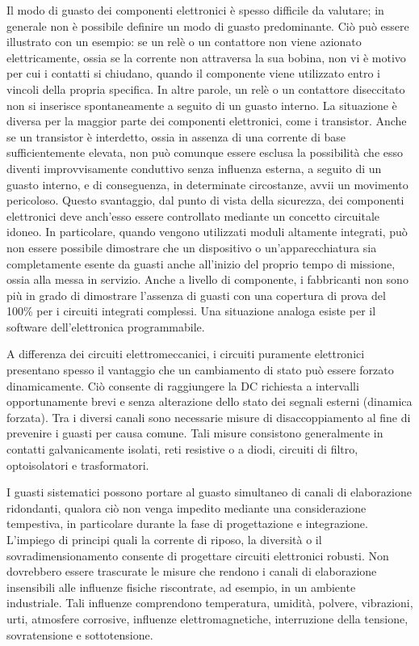 Il modo di guasto dei componenti elettronici è spesso difficile da valutare; in generale non è possibile definire un modo di guasto predominante. Ciò può essere illustrato con un esempio: se un relè o un contattore non viene azionato elettricamente, ossia se la corrente non attraversa la sua bobina, non vi è motivo per cui i contatti si chiudano, quando il componente viene utilizzato entro i vincoli della propria specifica. In altre parole, un relè o un contattore diseccitato non si inserisce spontaneamente a seguito di un guasto interno. La situazione è diversa per la maggior parte dei componenti elettronici, come i transistor. Anche se un transistor è interdetto, ossia in assenza di una corrente di base sufficientemente elevata, non può comunque essere esclusa la possibilità che esso diventi improvvisamente conduttivo senza influenza esterna, a seguito di un guasto interno, e di conseguenza, in determinate circostanze, avvii un movimento pericoloso. Questo svantaggio, dal punto di vista della sicurezza, dei componenti elettronici deve anch'esso essere controllato mediante un concetto circuitale idoneo. In particolare, quando vengono utilizzati moduli altamente integrati, può non essere possibile dimostrare che un dispositivo o un'apparecchiatura sia completamente esente da guasti anche all'inizio del proprio tempo di missione, ossia alla messa in servizio. Anche a livello di componente, i fabbricanti non sono più in grado di dimostrare l'assenza di guasti con una copertura di prova del 100\% per i circuiti integrati complessi. Una situazione analoga esiste per il software dell'elettronica programmabile.

A differenza dei circuiti elettromeccanici, i circuiti puramente elettronici presentano spesso il vantaggio che un cambiamento di stato può essere forzato dinamicamente. Ciò consente di raggiungere la DC richiesta a intervalli opportunamente brevi e senza alterazione dello stato dei segnali esterni (dinamica forzata). Tra i diversi canali sono necessarie misure di disaccoppiamento al fine di prevenire i guasti per causa comune. Tali misure consistono generalmente in contatti galvanicamente isolati, reti resistive o a diodi, circuiti di filtro, optoisolatori e trasformatori.

I guasti sistematici possono portare al guasto simultaneo di canali di elaborazione ridondanti, qualora ciò non venga impedito mediante una considerazione tempestiva, in particolare durante la fase di progettazione e integrazione. L'impiego di principi quali la corrente di riposo, la diversità o il sovradimensionamento consente di progettare circuiti elettronici robusti. Non dovrebbero essere trascurate le misure che rendono i canali di elaborazione insensibili alle influenze fisiche riscontrate, ad esempio, in un ambiente industriale. Tali influenze comprendono temperatura, umidità, polvere, vibrazioni, urti, atmosfere corrosive, influenze elettromagnetiche, interruzione della tensione, sovratensione e sottotensione.

